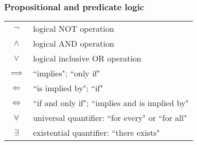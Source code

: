 \subsubsection*{Propositional and predicate logic}
\begin{tabular}{cl}
$\lnot$        & logical NOT operation \\
$\land$        & logical AND operation \\
$\lor$         & logical inclusive OR operation \\
$\implies$     & ``implies"; ``only if" \\
$\Longleftarrow$      & ``is implied by"; ``if" \\
$\iff$     & ``if and only if"; ``implies and is implied by" \\
$\forall$     & universal quantifier: ``for every" or ``for all" \\
$\exists$     & existential quantifier: ``there exists" \\
\end{tabular}


